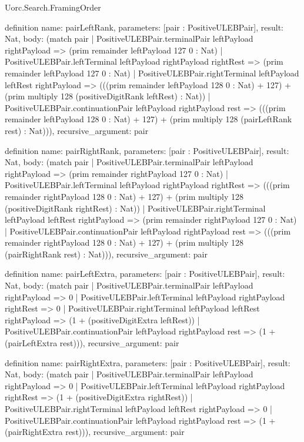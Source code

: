 \begin{lexlean}{Uorc.Search.FramingOrder}
\begin{semanticmodule}
definition{
  name: pairLeftRank,
  parameters: [pair : PositiveULEBPair],
  result: Nat,
  body: (match pair
    | PositiveULEBPair.terminalPair leftPayload rightPayload => (prim remainder leftPayload 127 0 : Nat)
    | PositiveULEBPair.leftTerminal leftPayload rightPayload rightRest => (prim remainder leftPayload 127 0 : Nat)
    | PositiveULEBPair.rightTerminal leftPayload leftRest rightPayload => (((prim remainder leftPayload 128 0 : Nat) + 127) + (prim multiply 128 (positiveDigitRank leftRest) : Nat))
    | PositiveULEBPair.continuationPair leftPayload rightPayload rest => (((prim remainder leftPayload 128 0 : Nat) + 127) + (prim multiply 128 (pairLeftRank rest) : Nat))),
  recursive_argument: pair
}

definition{
  name: pairRightRank,
  parameters: [pair : PositiveULEBPair],
  result: Nat,
  body: (match pair
    | PositiveULEBPair.terminalPair leftPayload rightPayload => (prim remainder rightPayload 127 0 : Nat)
    | PositiveULEBPair.leftTerminal leftPayload rightPayload rightRest => (((prim remainder rightPayload 128 0 : Nat) + 127) + (prim multiply 128 (positiveDigitRank rightRest) : Nat))
    | PositiveULEBPair.rightTerminal leftPayload leftRest rightPayload => (prim remainder rightPayload 127 0 : Nat)
    | PositiveULEBPair.continuationPair leftPayload rightPayload rest => (((prim remainder rightPayload 128 0 : Nat) + 127) + (prim multiply 128 (pairRightRank rest) : Nat))),
  recursive_argument: pair
}

definition{
  name: pairLeftExtra,
  parameters: [pair : PositiveULEBPair],
  result: Nat,
  body: (match pair
    | PositiveULEBPair.terminalPair leftPayload rightPayload => 0
    | PositiveULEBPair.leftTerminal leftPayload rightPayload rightRest => 0
    | PositiveULEBPair.rightTerminal leftPayload leftRest rightPayload => (1 + (positiveDigitExtra leftRest))
    | PositiveULEBPair.continuationPair leftPayload rightPayload rest => (1 + (pairLeftExtra rest))),
  recursive_argument: pair
}

definition{
  name: pairRightExtra,
  parameters: [pair : PositiveULEBPair],
  result: Nat,
  body: (match pair
    | PositiveULEBPair.terminalPair leftPayload rightPayload => 0
    | PositiveULEBPair.leftTerminal leftPayload rightPayload rightRest => (1 + (positiveDigitExtra rightRest))
    | PositiveULEBPair.rightTerminal leftPayload leftRest rightPayload => 0
    | PositiveULEBPair.continuationPair leftPayload rightPayload rest => (1 + (pairRightExtra rest))),
  recursive_argument: pair
}


\end{semanticmodule}
\end{lexlean}

